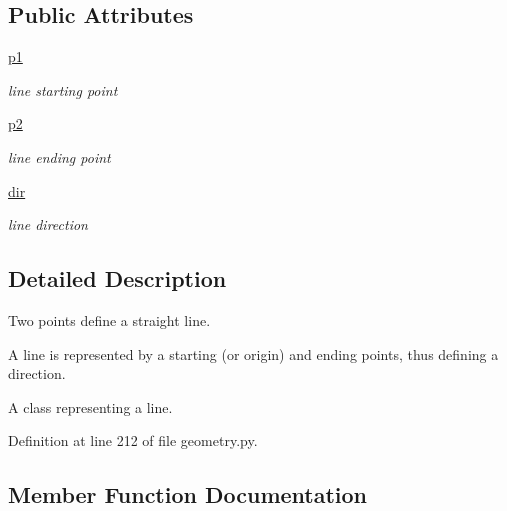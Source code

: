 \subsection*{Public Attributes}
\begin{DoxyCompactItemize}
\item 
\mbox{\label{classgeometry_1_1Line_aa46ea22a1b33099cbfa26a1646595a40}} 
\hyperlink{classgeometry_1_1Line_aa46ea22a1b33099cbfa26a1646595a40}{p1}
\begin{DoxyCompactList}\small\item\em line starting point \end{DoxyCompactList}\item 
\mbox{\label{classgeometry_1_1Line_a10b5fbbd99ed5d63848a09e50a782cdf}} 
\hyperlink{classgeometry_1_1Line_a10b5fbbd99ed5d63848a09e50a782cdf}{p2}
\begin{DoxyCompactList}\small\item\em line ending point \end{DoxyCompactList}\item 
\mbox{\label{classgeometry_1_1Line_a184c36a24c5e66becce19c0fe53c8b95}} 
\hyperlink{classgeometry_1_1Line_a184c36a24c5e66becce19c0fe53c8b95}{dir}
\begin{DoxyCompactList}\small\item\em line direction \end{DoxyCompactList}\end{DoxyCompactItemize}


\subsection{Detailed Description}
Two points define a straight line. 

A line is represented by a starting (or origin) and ending points, thus defining a direction.\begin{DoxyVerb}A class representing a line.\end{DoxyVerb}
 

Definition at line 212 of file geometry.\+py.



\subsection{Member Function Documentation}
\mbox{\label{classgeometry_1_1Line_a05b2f8b25c0025ba627523dc137f66cb}} 
